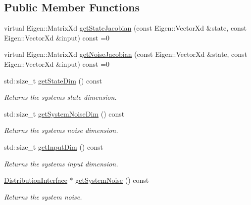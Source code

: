 \subsection*{Public Member Functions}
\begin{DoxyCompactItemize}
\item 
virtual Eigen\+::\+Matrix\+Xd \hyperlink{classrefill_1_1LinearizedSystemModel_a4a0bd58431d96f37cf52494fcbcd2d07}{get\+State\+Jacobian} (const Eigen\+::\+Vector\+Xd \&state, const Eigen\+::\+Vector\+Xd \&input) const =0
\item 
virtual Eigen\+::\+Matrix\+Xd \hyperlink{classrefill_1_1LinearizedSystemModel_a2fdc435d8e47f27ad167ff31827a1c48}{get\+Noise\+Jacobian} (const Eigen\+::\+Vector\+Xd \&state, const Eigen\+::\+Vector\+Xd \&input) const =0
\item 
std\+::size\+\_\+t \hyperlink{classrefill_1_1LinearizedSystemModel_a4969844eca728ca6666ff5350885f437}{get\+State\+Dim} () const 
\begin{DoxyCompactList}\small\item\em Returns the systems state dimension. \end{DoxyCompactList}\item 
std\+::size\+\_\+t \hyperlink{classrefill_1_1LinearizedSystemModel_a67b3556f960893d194d8550a71883d90}{get\+System\+Noise\+Dim} () const 
\begin{DoxyCompactList}\small\item\em Returns the systems noise dimension. \end{DoxyCompactList}\item 
std\+::size\+\_\+t \hyperlink{classrefill_1_1LinearizedSystemModel_ab0b9fad6d7af0a461f9a94fa050e9452}{get\+Input\+Dim} () const 
\begin{DoxyCompactList}\small\item\em Returns the systems input dimension. \end{DoxyCompactList}\item 
\hyperlink{classrefill_1_1DistributionInterface}{Distribution\+Interface} $\ast$ \hyperlink{classrefill_1_1LinearizedSystemModel_a4d77bbe4bd353226b107548bb93c9c58}{get\+System\+Noise} () const 
\begin{DoxyCompactList}\small\item\em Returns the system noise. \end{DoxyCompactList}\end{DoxyCompactItemize}

